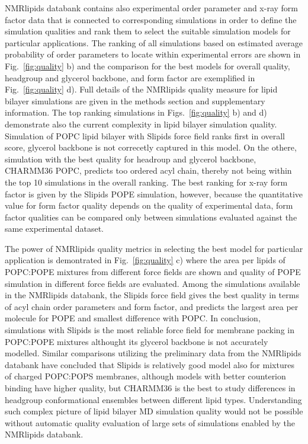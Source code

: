 \documentclass[fleqn,10pt]{wlscirep}
\begin{document}
NMRlipids databank contains also experimental order parameter and x-ray form factor data that is connected to corresponding  simulations in order to define the simulation qualities and rank them to select the suitable simulation models for particular applications. The ranking of all simulations based on estimated average probability of order parameters to locate within experimental errors are shown in Fig.~\ref{fig:quality} b) and the comparison for the best models for overall quality, headgroup and glycerol backbone, and form factor are exemplified in Fig.~\ref{fig:quality} d). Full details of the NMRlipids quality measure for lipid bilayer simulations are given in the methods section and supplementary information.
The top ranking simulations in Figs.~\ref{fig:quality} b) and d) demonstrate also the current complexity in lipid bilayer simulation quality. Simulation of POPC lipid bilayer with Slipids force field ranks first in overall score, glycerol backbone is not correcetly captured in this model. On the othere, simulation with the best quality for headroup and glycerol backbone, CHARMM36 POPC, predicts too ordered acyl chain, thereby not being within the top 10 simulations in the overall ranking. The best ranking for x-ray form factor is given by the Slipids POPE simulation, however, because the quantitative value for form factor quality depends on the quality of experimental data, form factor qualities can be compared only between simulations evaluated against the same experimental dataset.

The power of NMRlipids quality metrics in selecting the best model for particular application is demontrated in Fig.~\ref{fig:quality} c) where the area per lipids of POPC:POPE mixtures from different force fields are shown and quality of POPE simulation in different force fields are evaluated. Among the simulations available in the NMRlipids databank, the Slipids force field gives the best quality in terms of acyl chain order parameters and form factor, and predicts the largest area per molecule for POPE and smallest difference with POPC. In conclusion, simulations with Slipids is the most reliable force field for membrane packing in POPC:POPE mixtures althought its glycerol backbone is not accurately modelled. Similar comparisons utilizing the preliminary data from the NMRlipids databank have concluded that Slipids is relatively good model also for mixtures of charged POPC:POPS membranes, although models with better counterion binding have higher quality, but CHARMM36 is the best to study differences in headgroup conformational ensembles between different lipid types. Understanding such complex picture of lipid bilayer MD simulation quality would not be possible without automatic quality evaluation of large sets of simulations enabled by the NMRlipids databank.
\end{document}
